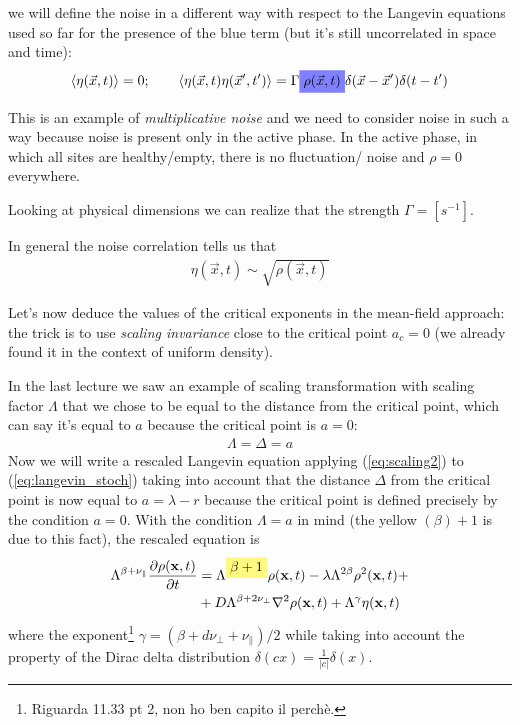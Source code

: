 \documentclass[\main/main.tex]{subfiles}
\begin{document}
we will define the noise in a different way with respect to the Langevin equations used so far for the presence of the blue term (but it's still uncorrelated in space and time):
\begin{align}
    \mean{\eta({\vec{x}},t)}=0;\quad \quad \mean{\eta(\vec{x},t)\eta(\vec{x}',t')}=\Gamma \hlc{blue}{\rho(\vec{x},t)}\delta(\vec{x}-\vec{x}')\delta(t-t')
\end{align}

This is an example of \textit{multiplicative noise} and we need to consider noise in such a way because noise is present only in the active phase.
In the active phase, in which all sites are healthy/empty, there is no fluctuation/ noise and $\rho=0$ everywhere.

Looking at physical dimensions we can realize that the strength $\Gamma = [s^{-1}]$.

In general the noise correlation tells us that 
\begin{align}
    \eta(\vec{x},t)\sim \sqrt{\rho(\vec{x},t)}
\end{align}

Let's now deduce the values of the critical exponents in the mean-field approach: the trick is to use \textit{scaling invariance} close to the critical point $a_c=0$ (we already found it in the context of uniform density).

In the last lecture we saw an example of scaling transformation with scaling factor $\Lambda$ that we chose to be equal to the distance from the critical point, which can say it's equal to $a$ because the critical point is $a=0$:
\begin{align}
    \Lambda=\Delta=a
\end{align}
Now we will write a rescaled Langevin equation applying (\ref{eq:scaling2}) to (\ref{eq:langevin_stoch}) taking into account that the distance $\Delta$ from the critical point is now equal to $a=\lambda-r$ because the critical point is defined precisely by the condition $a=0 .$ With the condition $\Lambda=a$ in mind (the yellow $(\beta)+1$ is due to this fact), the rescaled equation is
\begin{align}
\Lambda^{\beta+\nu_{\|}} \frac{\partial \rho(\mathbf{x}, t)}{\partial t} &=\Lambda^{\hlc{yellow}{\beta+1}} \rho(\mathbf{x}, t)-\lambda \Lambda^{2 \beta} \rho^{2}(\mathbf{x}, t)+ \\
&+ D \Lambda^{\beta+2 \nu_{\perp}} \nabla^{2} \rho(\mathbf{x}, t)+\Lambda^{\gamma} \eta(\mathbf{x}, t)
\label{eq:sc}
\end{align}
where the exponent\footnote{Riguarda 11.33 pt 2, non ho ben capito il perchè.} $\gamma=\left(\beta+d \nu_{\perp}+\nu_{\|}\right) / 2$ while taking into account the property of the Dirac delta distribution $\delta(c x)=\frac{1}{|c|} \delta(x)$.
\end{document}

